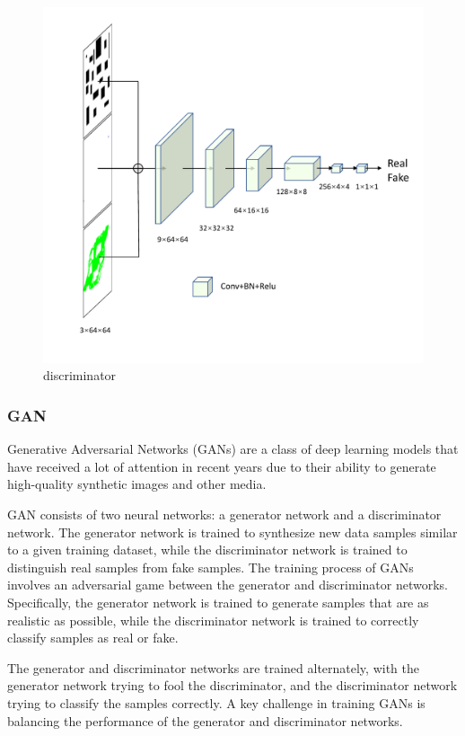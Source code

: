 \documentclass[smallcondensed]{svjour3}     %
\begin{document}
\begin{figure}
\centering
\includegraphics[scale=0.3]{network-discriminator.pdf}%
\caption{discriminator}     
\label{fig:discriminator}
\end{figure}


\subsubsection{GAN}
Generative Adversarial Networks (GANs) are a class of deep learning models that have received a lot of attention in recent years due to their ability to generate high-quality synthetic images and other media. 

GAN consists of two neural networks: a generator network and a discriminator network. 
The generator network is trained to synthesize new data samples similar to a given training dataset, while the discriminator network is trained to distinguish real samples from fake samples.
The training process of GANs involves an adversarial game between the generator and discriminator networks. 
Specifically, the generator network is trained to generate samples that are as realistic as possible, while the discriminator network is trained to correctly classify samples as real or fake. 

The generator and discriminator networks are trained alternately, with the generator network trying to fool the discriminator, and the discriminator network trying to classify the samples correctly.
A key challenge in training GANs is balancing the performance of the generator and discriminator networks. 
\end{document}
